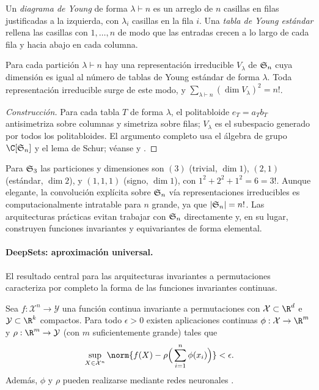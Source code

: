 \begin{definition}
\label{def:groups:young}
Un \emph{diagrama de Young} de forma $\lambda \vdash n$ es un arreglo de $n$
casillas en filas justificadas a la izquierda, con $\lambda_i$ casillas en la
fila $i$. Una \emph{tabla de Young est\'andar} rellena las casillas con $1,
\dots, n$ de modo que las entradas crecen a lo largo de cada fila y hacia abajo
en cada columna.
\end{definition}

\begin{theorem}
\label{thm:groups:sn-irreps}
Para cada partici\'on $\lambda \vdash n$ hay una representaci\'on irreducible
$V_\lambda$ de $\mathfrak{S}_n$ cuya dimensi\'on es igual al n\'umero de tablas de Young
est\'andar de forma $\lambda$. Toda representaci\'on irreducible surge de este
modo, y $\sum_{\lambda \vdash n} (\dim V_\lambda)^2 = n!$.
\end{theorem}

\begin{proof}[Construcci\'on]
Para cada tabla $T$ de forma $\lambda$, el politabloide $e_T = a_T b_T$
antisimetriza sobre columnas y simetriza sobre filas; $V_\lambda$ es el subespacio
generado por todos los politabloides. El argumento completo usa el \'algebra de
grupo $\C[\Sym_n]$ y el lema de Schur; v\'eanse \citet{sagan2001symmetric} y
\citet{fulton1997young}.
\end{proof}

Para $\mathfrak{S}_3$ las particiones y dimensiones son $(3)$ (trivial, $\dim 1$),
$(2,1)$ (est\'andar, $\dim 2$), y $(1,1,1)$ (signo, $\dim 1$), con $1^2 + 2^2 +
1^2 = 6 = 3!$. Aunque elegante, la convoluci\'on expl\'icita sobre $\mathfrak{S}_n$ v\'ia
representaciones irreducibles es computacionalmente intratable para $n$ grande,
ya que $|\mathfrak{S}_n| = n!$. Las arquitecturas pr\'acticas evitan trabajar con
$\mathfrak{S}_n$ directamente y, en su lugar, construyen funciones invariantes y
equivariantes de forma elemental.

\paragraph{DeepSets: aproximaci\'on universal.}
El resultado central para las arquitecturas invariantes a permutaciones
caracteriza por completo la forma de las funciones invariantes continuas.

\begin{theorem}
\label{thm:groups:deepsets}
Sea $f: \mathcal{X}^n \to \mathcal{Y}$ una funci\'on continua invariante a
permutaciones con $\mathcal{X} \subset \R^d$ e $\mathcal{Y} \subset \R^k$
compactos. Para todo $\epsilon > 0$ existen aplicaciones continuas $\phi:
\mathcal{X} \to \R^m$ y $\rho: \R^m \to \mathcal{Y}$ (con $m$ suficientemente
grande) tales que
\begin{equation}
  \sup_{X \in \mathcal{X}^n}
    \norm{f(X) - \rho\Big(\sum_{i=1}^n \phi(x_i)\Big)} < \epsilon.
  \label{eq:groups:deepsets}
\end{equation}
Adem\'as, $\phi$ y $\rho$ pueden realizarse mediante redes neuronales
\citep{zaheer2017deepsets}.
\end{theorem}

